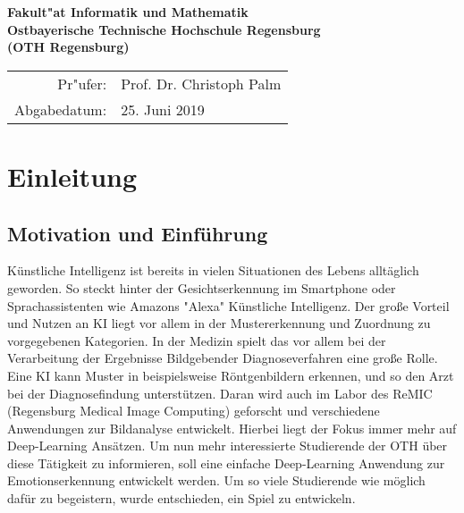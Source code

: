 \documentclass[12pt,a4paper,headinclude,twoside, plainheadsepline, open=right,numbers=noenddot]{scrreprt}
\begin{document}
\begin{titlepage}
\begin{center}
\vfill
\vfill
\textbf{\large Fakult"at Informatik und Mathematik\\
Ostbayerische Technische Hochschule Regensburg\\
(OTH Regensburg)}
\vfill
\vfill

\begin{tabular}{rl}
Pr"ufer:   & Prof. Dr. Christoph Palm\\
Abgabedatum:& 25. Juni 2019
\end{tabular}
\end{center}
\end{titlepage}


\pagestyle{useheadings} %
\tableofcontents %


\chapter{Einleitung}
\label{einleitung}

\section{Motivation und Einführung}
Künstliche Intelligenz ist bereits in vielen Situationen des Lebens alltäglich geworden. So steckt hinter der Gesichtserkennung im Smartphone oder Sprachassistenten wie Amazons "{}Alexa"{} Künstliche Intelligenz. Der große Vorteil und Nutzen an KI liegt vor allem in der Mustererkennung und Zuordnung zu vorgegebenen Kategorien. In der Medizin spielt das vor allem bei der Verarbeitung der Ergebnisse Bildgebender Diagnoseverfahren eine große Rolle. Eine KI kann Muster in beispielsweise Röntgenbildern erkennen, und so den Arzt bei der Diagnosefindung unterstützen.
Daran wird auch im Labor des ReMIC (Regensburg Medical Image Computing) geforscht und verschiedene Anwendungen zur Bildanalyse entwickelt. Hierbei liegt der Fokus immer mehr auf Deep-Learning Ansätzen. Um nun mehr interessierte Studierende der OTH über diese Tätigkeit zu informieren, soll eine einfache Deep-Learning Anwendung zur Emotionserkennung entwickelt werden. Um so viele Studierende wie möglich dafür zu begeistern, wurde entschieden, ein Spiel zu entwickeln. 
\end{document}
